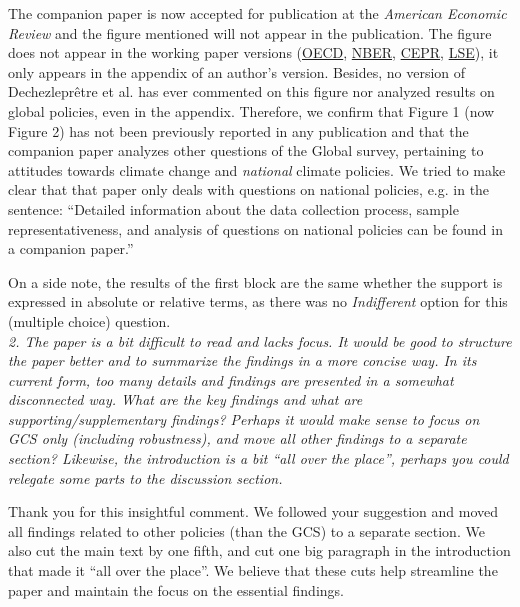 \documentclass[12pt,english]{article}
\begin{document}
The companion paper is now accepted for publication at the \textit{American Economic Review} and the figure mentioned will not appear in the publication. The figure does not appear in the working paper versions (\href{https://www.oecd.org/climate-change/international-attitudes-toward-climate-policies/}{OECD}, \href{https://data.nber.org/data-appendix/w30265/International_Attitudes_Toward_Climate_Change_OA.pdf}{NBER}, \href{https://repec.cepr.org/repec/cpr/ceprdp/DP17602.pdf}{CEPR}, \href{https://www.lse.ac.uk/granthaminstitute/wp-content/uploads/2022/12/working-paper-384-Dechezlepretre-et-al.pdf}{LSE}), it only appears in the appendix of an author's version. Besides, no version of Dechezleprêtre et al. has ever commented on this figure nor analyzed results on global policies, even in the appendix. Therefore, we confirm that Figure 1 (now Figure 2) has not been previously reported in any publication and that the companion paper analyzes other questions of the Global survey, pertaining to attitudes towards climate change and \textit{national} climate policies. We tried to make clear that that paper only deals with questions on national policies, e.g. in the sentence: ``Detailed information about the data collection process, sample representativeness, and analysis of questions on national policies can be found in a companion paper.''

On a side note, the results of the first block are the same whether the support is expressed in absolute or relative terms, as there was no \textit{Indifferent} option for this (multiple choice) question.
~\\

\textit{2. The paper is a bit difficult to read and lacks focus. It would be good to structure the paper better and to summarize the findings in a more concise way. In its current form, too many details and findings are presented in a somewhat disconnected way. What are the key findings and what are supporting/supplementary findings? Perhaps it would make sense to focus on GCS only (including robustness), and move all other findings to a separate section? Likewise, the introduction is a bit “all over the place”, perhaps you could relegate some parts to the discussion section.}

Thank you for this insightful comment. We followed your suggestion and moved all findings related to other policies (than the GCS) to a separate section. We also cut the main text by one fifth, and cut one big paragraph in the introduction that made it ``all over the place''. We believe that these cuts help streamline the paper and maintain the focus on the essential findings.
~\\
\end{document}
